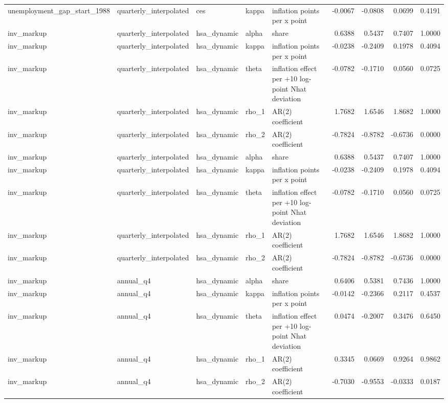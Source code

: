 \begin{tabular}{lllllrrrr}
unemployment\_gap\_start\_1988 & quarterly\_interpolated & ces & kappa & inflation points per x point & -0.0067 & -0.0808 & 0.0699 & 0.4191 \\
inv\_markup & quarterly\_interpolated & hsa\_dynamic & alpha & share & 0.6388 & 0.5437 & 0.7407 & 1.0000 \\
inv\_markup & quarterly\_interpolated & hsa\_dynamic & kappa & inflation points per x point & -0.0238 & -0.2409 & 0.1978 & 0.4094 \\
inv\_markup & quarterly\_interpolated & hsa\_dynamic & theta & inflation effect per +10 log-point Nhat deviation & -0.0782 & -0.1710 & 0.0560 & 0.0725 \\
inv\_markup & quarterly\_interpolated & hsa\_dynamic & rho\_1 & AR(2) coefficient & 1.7682 & 1.6546 & 1.8682 & 1.0000 \\
inv\_markup & quarterly\_interpolated & hsa\_dynamic & rho\_2 & AR(2) coefficient & -0.7824 & -0.8782 & -0.6736 & 0.0000 \\
inv\_markup & quarterly\_interpolated & hsa\_dynamic & alpha & share & 0.6388 & 0.5437 & 0.7407 & 1.0000 \\
inv\_markup & quarterly\_interpolated & hsa\_dynamic & kappa & inflation points per x point & -0.0238 & -0.2409 & 0.1978 & 0.4094 \\
inv\_markup & quarterly\_interpolated & hsa\_dynamic & theta & inflation effect per +10 log-point Nhat deviation & -0.0782 & -0.1710 & 0.0560 & 0.0725 \\
inv\_markup & quarterly\_interpolated & hsa\_dynamic & rho\_1 & AR(2) coefficient & 1.7682 & 1.6546 & 1.8682 & 1.0000 \\
inv\_markup & quarterly\_interpolated & hsa\_dynamic & rho\_2 & AR(2) coefficient & -0.7824 & -0.8782 & -0.6736 & 0.0000 \\
inv\_markup & annual\_q4 & hsa\_dynamic & alpha & share & 0.6406 & 0.5381 & 0.7436 & 1.0000 \\
inv\_markup & annual\_q4 & hsa\_dynamic & kappa & inflation points per x point & -0.0142 & -0.2366 & 0.2117 & 0.4537 \\
inv\_markup & annual\_q4 & hsa\_dynamic & theta & inflation effect per +10 log-point Nhat deviation & 0.0474 & -0.2007 & 0.3476 & 0.6450 \\
inv\_markup & annual\_q4 & hsa\_dynamic & rho\_1 & AR(2) coefficient & 0.3345 & 0.0669 & 0.9264 & 0.9862 \\
inv\_markup & annual\_q4 & hsa\_dynamic & rho\_2 & AR(2) coefficient & -0.7030 & -0.9553 & -0.0333 & 0.0187 \\

\end{tabular}

